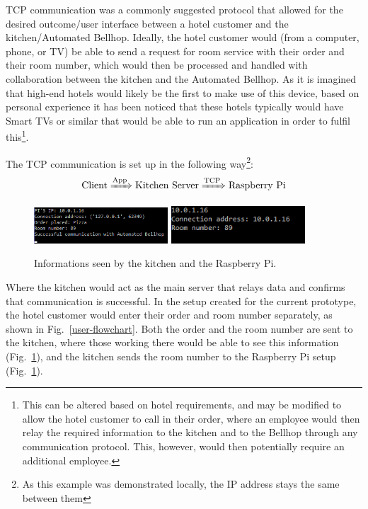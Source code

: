 \documentclass[11pt]{article}
\begin{document}
TCP communication was a commonly suggested protocol that allowed for the desired outcome/user interface between a hotel customer and the kitchen/Automated Bellhop. Ideally, the hotel customer would (from a computer, phone, or TV) be able to send a request for room service with their order and their room number, which would then be processed and handled with collaboration between the kitchen and the Automated Bellhop. As it is imagined that high-end hotels would likely be the first to make use of this device, based on personal experience it has been noticed that these hotels typically would have Smart TVs or similar that would be able to run an application in order to fulfil this\footnote{This can be altered based on hotel requirements, and may be modified to allow the hotel customer to call in their order, where an employee would then relay the required information to the kitchen and to the Bellhop through any communication protocol. This, however, would then potentially require an additional employee.}.


The TCP communication is set up in the following way\footnote{As this example was demonstrated locally, the IP address stays the same between them}:
$$\text{Client} \xRightarrow[]{\text{App}} \text{Kitchen Server} \xRightarrow[]{\text{TCP}} \text{Raspberry Pi}$$



\begin{figure}
  \includegraphics[width=5cm]{TCPkit.png}
  \includegraphics[width=5cm]{TCPpi.png}
  \caption{Informations seen by the kitchen and the Raspberry Pi.}
  \label{tcppi}
\end{figure}


Where the kitchen would act as the main server that relays data and confirms that communication is successful. In the setup created for the current prototype, the hotel customer would enter their order and room number separately, as shown in Fig.~\ref{user-flowchart}. Both the order and the room number are sent to the kitchen, where those working there would be able to see this information (Fig.~\ref{tcppi}), and the kitchen sends the room number to the Raspberry Pi setup (Fig.~\ref{tcppi}).
\end{document}
